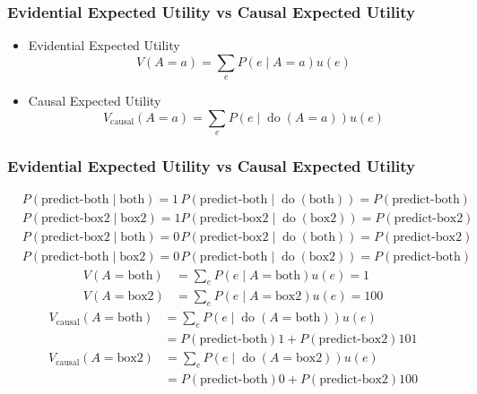 \documentclass[UTF8,11pt,colorlinks,compress,openany]{beamer}%
\begin{document}
\begin{frame}\frametitle{Evidential Expected Utility vs Causal Expected Utility}
\begin{itemize}
	\item Evidential Expected Utility
	\[V(A=a)=\sum\limits_e P(e\mid A=a)u(e)\]
	\item Causal Expected Utility
	\[V_{\mathrm{causal}}(A=a)=\sum\limits_e P(e\mid \operatorname{do}(A=a))u(e)\]
\end{itemize}
\end{frame}

\begin{frame}\frametitle{Evidential Expected Utility vs Causal Expected Utility}
\setlength\abovedisplayskip{0pt}
\setlength\belowdisplayskip{0pt}
\begin{align*}
	&P(\text{predict-both}\mid\text{both})=1 & P(\text{predict-both}\mid \operatorname{do}(\text{both}))=P(\text{predict-both})\\
	&P(\text{predict-box2}\mid\text{box2})=1 & P(\text{predict-box2}\mid \operatorname{do}(\text{box2}))=P(\text{predict-box2})\\
	&P(\text{predict-box2}\mid\text{both})=0 & P(\text{predict-box2}\mid \operatorname{do}(\text{both}))=P(\text{predict-box2})\\
	&P(\text{predict-both}\mid\text{box2})=0 & P(\text{predict-both}\mid \operatorname{do}(\text{box2}))=P(\text{predict-both})
\end{align*}
\begin{align*}
V(A=\text{both})&=\sum\limits_e P(e\mid A=\text{both})u(e)=1\\
V(A=\text{box2})&=\sum\limits_e P(e\mid A=\text{box2})u(e)=100
\end{align*}
\begin{align*}
V_{\mathrm{causal}}(A=\text{both})&=\sum\limits_e P(e\mid \operatorname{do}(A=\text{both}))u(e)\\
&=P(\text{predict-both})1+P(\text{predict-box2})101
\end{align*}
\begin{align*}
V_{\mathrm{causal}}(A=\text{box2})&=\sum\limits_e P(e\mid \operatorname{do}(A=\text{box2}))u(e)\\
&=P(\text{predict-both})0+P(\text{predict-box2})100
\end{align*}
\end{frame}
\end{document}
